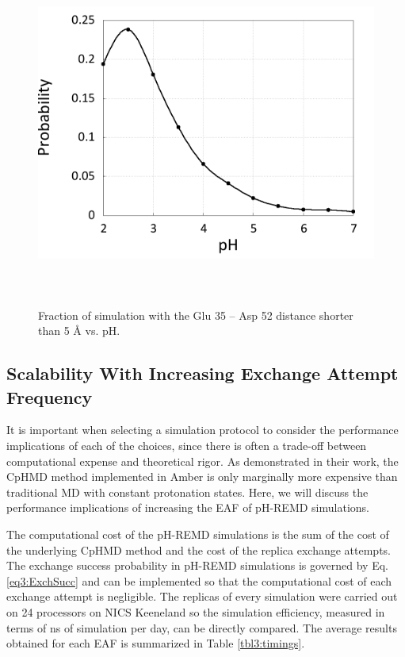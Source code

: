 \begin{figure}
 \includegraphics[width=6in, height=4.5in]{Catalytic_Distances_Int.png}
 \caption{Fraction of simulation with the Glu 35 -- Asp 52 distance shorter than
          5 \mbox{\normalfont \AA} vs. pH.}
 \label{fig3:cat_dist_int}
\end{figure}

\subsection{Scalability With Increasing Exchange Attempt Frequency}

It is important when selecting a simulation protocol to consider the performance
implications of each of the choices, since there is often a trade-off between
computational expense and theoretical rigor.  As \citeauthor{Mongan2004}
demonstrated in their work, the CpHMD method implemented in Amber is only
marginally more expensive than traditional MD with constant protonation states.
\cite{Mongan2004}  Here, we will discuss the performance implications of
increasing the EAF of pH-REMD simulations.

The computational cost of the pH-REMD simulations is the sum of the cost of the
underlying CpHMD method \cite{Mongan2004} and the cost of the replica exchange
attempts.  The exchange success probability in pH-REMD simulations is governed
by Eq. \ref{eq3:ExchSucc} and can be implemented so that the computational cost
of each exchange attempt is negligible.  The replicas of every simulation were
carried out on 24 processors on NICS Keeneland \cite{Vetter2011} so the
simulation efficiency, measured in terms of ns of simulation per day, can be
directly compared. The average results obtained for each EAF is summarized in
Table \ref{tbl3:timings}.

